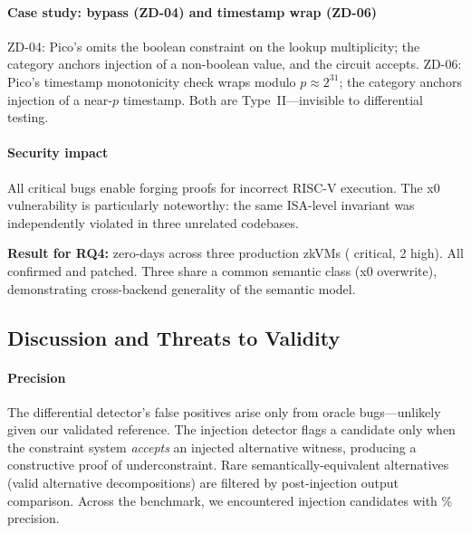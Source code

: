 \paragraph{Case study:  bypass (ZD-04) and timestamp wrap (ZD-06)}
ZD-04: Pico's  omits the boolean constraint on the  lookup multiplicity; the  category anchors injection of a non-boolean value, and the circuit accepts. ZD-06: Pico's timestamp monotonicity check wraps modulo $p \approx 2^{31}$; the  category anchors injection of a near-$p$ timestamp. Both are Type~II---invisible to differential testing.

\paragraph{Security impact}
All  critical bugs enable forging proofs for incorrect RISC-V execution. The x0 vulnerability is particularly noteworthy: the same ISA-level invariant was independently violated in three unrelated codebases.

\begin{mdframed}[
    backgroundcolor=gray!10,
    linecolor=white,
    skipabove=0.5em
    ]\noindent
    \textbf{Result for RQ4:}  zero-days across three production zkVMs ( critical, 2 high). All confirmed and patched. Three share a common semantic class (x0 overwrite), demonstrating cross-backend generality of the semantic model.
\end{mdframed}

\subsection{Discussion and Threats to Validity}\label{sec:eval-threats}

\paragraph{Precision}
The differential detector's false positives arise only from oracle bugs---unlikely given our validated  reference. The injection detector flags a candidate only when the constraint system \emph{accepts} an injected alternative witness, producing a constructive proof of underconstraint. Rare semantically-equivalent alternatives (valid alternative decompositions) are filtered by post-injection output comparison. Across the benchmark, we encountered  injection candidates with \% precision.

